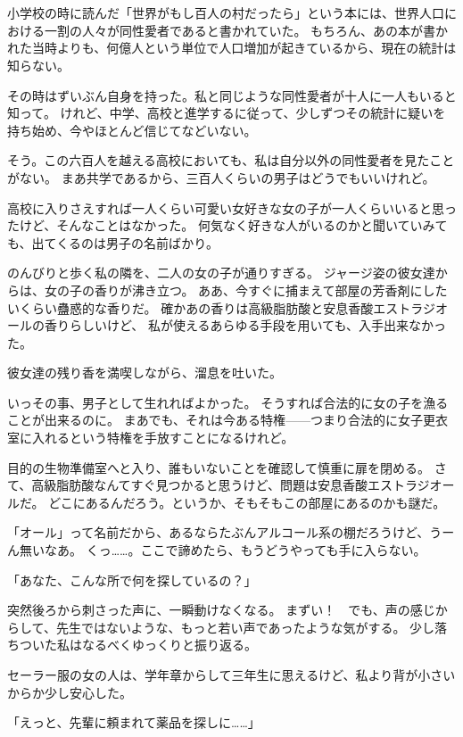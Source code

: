 \section{}
小学校の時に読んだ「世界がもし百人の村だったら」という本には、世界人口における一割の人々が同性愛者であると書かれていた。
もちろん、あの本が書かれた当時よりも、何億人という単位で人口増加が起きているから、現在の統計は知らない。

その時はずいぶん自身を持った。私と同じような同性愛者が十人に一人もいると知って。
けれど、中学、高校と進学するに従って、少しずつその統計に疑いを持ち始め、今やほとんど信じてなどいない。

そう。この六百人を越える高校においても、私は自分以外の同性愛者を見たことがない。
まあ共学であるから、三百人くらいの男子はどうでもいいけれど。

高校に入りさえすれば一人くらい可愛い女好きな女の子が一人くらいいると思ったけど、そんなことはなかった。
何気なく好きな人がいるのかと聞いていみても、出てくるのは男子の名前ばかり。

のんびりと歩く私の隣を、二人の女の子が通りすぎる。
ジャージ姿の彼女達からは、女の子の香りが沸き立つ。
ああ、今すぐに捕まえて部屋の芳香剤にしたいくらい蠱惑的な香りだ。
確かあの香りは高級脂肪酸と安息香酸エストラジオールの香りらしいけど、
私が使えるあらゆる手段を用いても、入手出来なかった。

彼女達の残り香を満喫しながら、溜息を吐いた。

いっその事、男子として生れればよかった。
そうすれば合法的に女の子を漁ることが出来るのに。
まあでも、それは今ある特権------つまり合法的に女子更衣室に入れるという特権を手放すことになるけれど。

目的の生物準備室へと入り、誰もいないことを確認して慎重に扉を閉める。
さて、高級脂肪酸なんてすぐ見つかると思うけど、問題は安息香酸エストラジオールだ。
どこにあるんだろう。というか、そもそもこの部屋にあるのかも謎だ。

「オール」って名前だから、あるならたぶんアルコール系の棚だろうけど、うーん無いなあ。
くっ……。ここで諦めたら、もうどうやっても手に入らない。

「あなた、こんな所で何を探しているの？」

突然後ろから刺さった声に、一瞬動けなくなる。
まずい！　でも、声の感じからして、先生ではないような、もっと若い声であったような気がする。
少し落ちついた私はなるべくゆっくりと振り返る。

セーラー服の女の人は、学年章からして三年生に思えるけど、私より背が小さいからか少し安心した。

「えっと、先輩に頼まれて薬品を探しに……」

